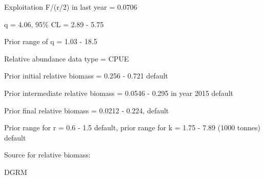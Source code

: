 \documentclass[12pt,a4paper]{article}\usepackage[]{graphicx}\usepackage[]{xcolor}
\begin{document}
Exploitation F/(r/2) in last year = 0.0706

q = 4.06, 95\% CL = 2.89 - 5.75

Prior range of q = 1.03 - 18.5

Relative abundance data type = CPUE

Prior initial relative biomass = 0.256 - 0.721 default

Prior intermediate relative biomass = 0.0546 - 0.295 in year 2015 default

Prior final relative biomass = 0.0212 - 0.224, default

Prior range for r = 0.6 - 1.5 default, prior range for k = 1.75 - 7.89 (1000 tonnes) default

Source for relative biomass: 

DGRM

    
\end{document}
